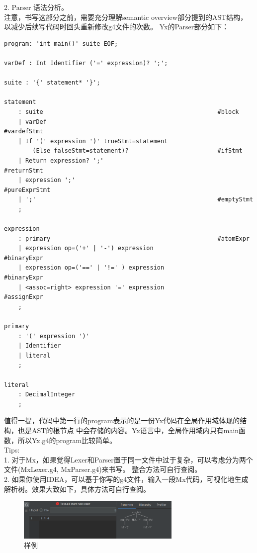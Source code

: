 2. Parser 语法分析。\\
注意，书写这部分之前，需要充分理解semantic overview部分提到的AST结构，
以减少后续写代码时回头重新修改g4文件的次数。
Yx的Parser部分如下：
\begin{lstlisting}
program: 'int main()' suite EOF;

varDef : Int Identifier ('=' expression)? ';';

suite : '{' statement* '}';

statement
    : suite                                                 #block
    | varDef                                                #vardefStmt
    | If '(' expression ')' trueStmt=statement 
        (Else falseStmt=statement)?                         #ifStmt
    | Return expression? ';'                                #returnStmt
    | expression ';'                                        #pureExprStmt
    | ';'                                                   #emptyStmt
    ;

expression
    : primary                                               #atomExpr
    | expression op=('+' | '-') expression                  #binaryExpr
    | expression op=('==' | '!=' ) expression               #binaryExpr
    | <assoc=right> expression '=' expression               #assignExpr
    ;

primary
    : '(' expression ')'
    | Identifier 
    | literal 
    ;

literal
    : DecimalInteger
    ;
\end{lstlisting}
值得一提，代码中第一行的program表示的是一份Yx代码在全局作用域体现的结构，也是AST的根节点
中会存储的内容。Yx语言中，全局作用域内只有main函数，所以Yx.g4的program比较简单。\\

Tips: \\
1. 对于Mx，如果觉得Lexer和Parser置于同一文件中过于复杂，可以考虑分为两个文件(MxLexer.g4, MxParser.g4)来书写。
整合方法可自行查阅。\\
2. 如果你使用IDEA，可以基于你写的g4文件，输入一段Mx代码，可视化地生成解析树。效果大致如下，具体方法可自行查阅。
\begin{figure}[htbp]
    \centering
    \includegraphics[width=0.7\textwidth]{image/g4.png}
    \caption{样例}
\end{figure}


